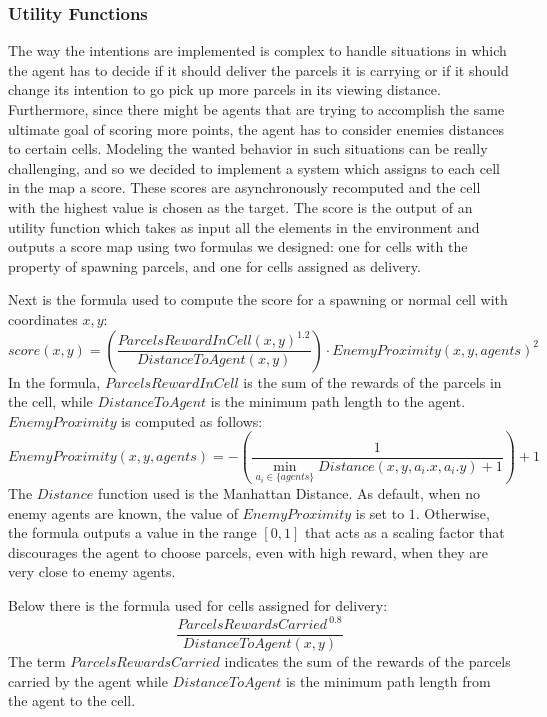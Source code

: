 \documentclass[a4paper, 11pt]{article}
\begin{document}
\subsubsection{Utility Functions}
The way the intentions are implemented is complex to handle situations in which the agent has to decide if it should deliver the parcels it is carrying or if it should change its intention to go pick up more parcels in its viewing distance. Furthermore, since there might be agents that are trying to accomplish the same ultimate goal of scoring more points, the agent has to consider enemies distances to certain cells. Modeling the wanted behavior in such situations can be really challenging, and so we decided to implement a system which assigns to each cell in the map a score. These scores are asynchronously recomputed and the cell with the highest value is chosen as the target. The score is the output of an utility function which takes as input all the elements in the environment and outputs a score map using two formulas we designed: one for cells with the property of spawning parcels, and one for cells assigned as delivery.

Next is the formula used to compute the score for a spawning or normal cell with coordinates $x,y$:
\begin{equation}
score(x,y) = \left(\frac{{ParcelsRewardInCell(x,y)^{1.2}}}{{DistanceToAgent(x,y)}}\right) \cdot EnemyProximity(x,y,agents)^2
\end{equation}
In the formula, $ParcelsRewardInCell$ is the sum of the rewards of the parcels in the cell, while $DistanceToAgent$ is the minimum path length to the agent. $EnemyProximity$ is computed as follows:
\begin{equation}
EnemyProximity(x,y,agents) = -(\frac{1}{\min_{a_{i} \in \{agents\}} Distance(x, y, a_{i}.x, a_{i}.y) +1}) + 1
\end{equation}
The $Distance$ function used is the Manhattan Distance. As default, when no enemy agents are known, the value of $EnemyProximity$ is set to $1$. Otherwise, the formula outputs a value in the range $[0,1]$ that acts as a scaling factor that discourages the agent to choose parcels, even with high reward, when they are very close to enemy agents.

Below there is the formula used for cells assigned for delivery:
\begin{equation}
\frac{ParcelsRewardsCarried^{~0.8}}{DistanceToAgent(x,y)}
\end{equation}
The term $ParcelsRewardsCarried$ indicates the sum of the rewards of the parcels carried by the agent while $DistanceToAgent$ is the minimum path length from the agent to the cell.
\end{document}
